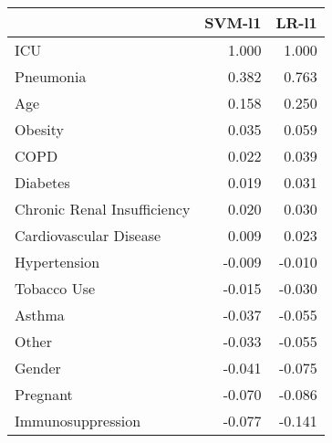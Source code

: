 \begin{tabular}{lrr}
\toprule
{} &  SVM-l1 &  LR-l1 \\
\midrule
ICU                         &   1.000 &  1.000 \\
Pneumonia                   &   0.382 &  0.763 \\
Age                         &   0.158 &  0.250 \\
Obesity                     &   0.035 &  0.059 \\
COPD                        &   0.022 &  0.039 \\
Diabetes                    &   0.019 &  0.031 \\
Chronic Renal Insufficiency &   0.020 &  0.030 \\
Cardiovascular Disease      &   0.009 &  0.023 \\
Hypertension                &  -0.009 & -0.010 \\
Tobacco Use                 &  -0.015 & -0.030 \\
Asthma                      &  -0.037 & -0.055 \\
Other                       &  -0.033 & -0.055 \\
Gender                      &  -0.041 & -0.075 \\
Pregnant                    &  -0.070 & -0.086 \\
Immunosuppression           &  -0.077 & -0.141 \\
\bottomrule
\end{tabular}
